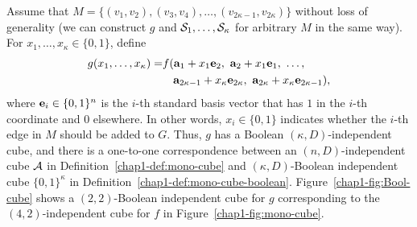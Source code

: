 {%
Assume that 
$M = \{(v_1, v_2), (v_3, v_4), \ldots, (v_{2\kappa-1}, v_{2\kappa})\}$ without loss of generality 
(we can construct $g$ and $\mathcal{S}_1, \ldots, \mathcal{S}_\kappa$ for arbitrary $M$ in the same way). 
For $x_1, \ldots, x_\kappa \in \{0,1\}$, 
define
\begin{align*}
  g(x_1, \ldots, x_\kappa) = & f(\mathbf{a}_1 + x_1 \mathbf{e}_2,~ \mathbf{a}_2 + x_1 \mathbf{e}_1,~ \ldots,  \\
  &\hspace{3.3mm}\mathbf{a}_{2\kappa-1} + x_\kappa \mathbf{e}_{2\kappa},~ \mathbf{a}_{2\kappa} + x_\kappa \mathbf{e}_{2\kappa-1}),
\end{align*}
where $\mathbf{e}_i \in \{0,1\}^n$ is the $i$-th standard basis vector that has $1$ in the $i$-th coordinate and $0$ elsewhere. 
In other words, 
$x_i \in \{0,1\}$ indicates whether the $i$-th edge in $M$ should be
added to 
$G$. 
Thus, $g$ has a Boolean $(\kappa,D)$-independent cube, and 
there is a one-to-one correspondence between an $(n,D)$-independent cube $\mathcal{A}$ in Definition~\ref{chap1-def:mono-cube} 
and 
$(\kappa,D)$-Boolean independent cube $\{0,1\}^\kappa$ in Definition~\ref{chap1-def:mono-cube-boolean}. 
Figure~\ref{chap1-fig:Bool-cube} shows a $(2,2)$-Boolean independent cube for $g$ corresponding to the $(4,2)$-independent cube for $f$ in Figure~\ref{chap1-fig:mono-cube}.

}
